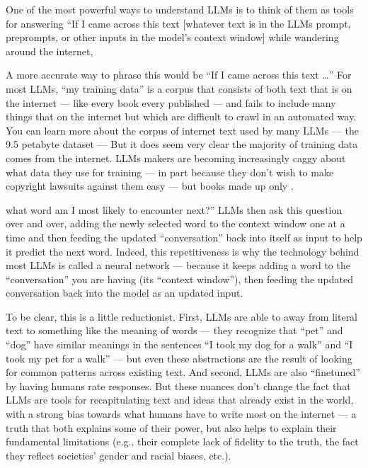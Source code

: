 \documentclass[letterpaper,10pt,english]{jupyterBook}
\begin{document}
\sphinxAtStartPar
One of the most powerful ways to understand LLMs is to think of them as tools for answering “If I came across this text {[}whatever text is in the LLMs prompt, pre\sphinxhyphen{}prompts, or other inputs in the model’s context window{]} while wandering around the internet,%
\begin{footnote}[1]\sphinxAtStartFootnote
A more accurate way to phrase this would be “If I came across this text …” For most LLMs, “my training data” is a corpus that consists of both text that is  on the internet — like every book every published — and fails to include many things that  on the internet but which are difficult to crawl in an automated way. You can learn more about the corpus of internet text used by many LLMs — the 9.5 petabyte  dataset —  But it does seem very clear the  majority of training data comes from the internet. LLMs makers are becoming increasingly caggy about what data they use for training — in part because they don’t wish to make copyright lawsuits against them  easy — but books made up only .
%
\end{footnote} what word am I most likely to encounter next?” LLMs then ask this question over and over, adding the newly selected word to the context window one at a time and then feeding the updated “conversation” back into itself as input to help it predict the next word. Indeed, this repetitiveness is why the technology behind most LLMs is called a  neural network — because it keeps adding a word to the “conversation” you are having (its “context window”), then feeding the updated conversation back into the model as an updated input.

\sphinxAtStartPar
To be clear, this is a little reductionist. First, LLMs are able to  away from literal text to something like the meaning of words — they recognize that “pet” and “dog” have similar meanings in the sentences “I took my dog for a walk” and “I took my pet for a walk” — but even these abstractions are the result of looking for common patterns across existing text. And second, LLMs are also “fine\sphinxhyphen{}tuned” by having humans rate responses. But these nuances don’t change the fact that  LLMs are tools for recapitulating text and ideas that already exist in the world, with a strong bias towards what humans have  to write most on the internet — a truth that both explains some of their power, but also helps to explain their fundamental limitations (e.g., their complete lack of fidelity to the truth, the fact they reflect societies’ gender and racial biases, etc.).
\end{document}
